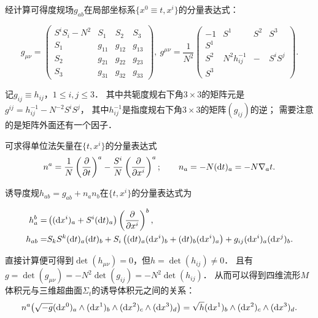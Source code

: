 经计算可得度规场$g_{ab}$在局部坐标系$\{x^0\equiv t,x^i \}$的分量表达式：
\begin{small}
\begin{equation}\label{chsm:eqn_ADM-metric}
    g_{\mu\nu}=\begin{pmatrix}
        S^i S_i -N^2 & S_1 & S_2 &S_3 \\
        S_1 &g_{11} & g_{12} & g_{13} \\
        S_2 &g_{21} & g_{22} & g_{23} \\
        S_3 &g_{31} & g_{32} & g_{33}
    \end{pmatrix}, \
    g^{\mu\nu}=\frac{1}{N^{2}} \begin{pmatrix}
        -1 & S^1 & S^2 & S^3 \\
        S^1 & &  &  \\
        S^2 &N^{2} h_{ij}^{-1} & - & S^i S^j \\
        S^3 & &  &
    \end{pmatrix} .
\end{equation}
\end{small}
记$g_{ij}\equiv h_{ij}$，$1\leqslant i,j \leqslant 3$．
其中共轭度规右下角$3\times 3$的矩阵元是$g^{ij}= h_{ij}^{-1}-N^{-2}S^i S^j$，
其中$h_{ij}^{-1}$是指度规右下角$3\times 3$的矩阵$(g_{ij})$的逆；
需要注意的是矩阵外面还有一个因子．

可求得单位法矢量在$\{t,x^i\}$的分量表达式
\begin{equation}\label{chsm:eqn_ADM-n}
    n^a = \frac{1}{N} \left(\frac{\partial }{\partial t}\right)^a
    -\frac{S^i}{N} \left(\frac{\partial }{\partial x^i}\right)^a  ;\qquad
    n_a = -N ({\rm d}t)_a = -N \nabla_a t .
\end{equation}


诱导度规$h_{ab}=g_{ab}+n_a n_b$在$\{t,x^i\}$的分量表达式为
\begin{small}
\begin{subequations}\label{chsm:eqn_ADM-hab}
\begin{align}
    h_a^b =& \left( ({\rm d}x^i)_a +S^i ({\rm d}t)_a \right) 
    \left(\frac{\partial }{\partial x^i}\right)^b , \label{chsm:eqn_ADM-hab-1}\\
    h_{ab}=& S_k S^k ({\rm d}t)_a ({\rm d}t)_b + S_i\left( ({\rm d}t)_a ({\rm d}x^i)_b
    + ({\rm d}t)_b ({\rm d}x^i)_a \right) + g_{ij} ({\rm d}x^i)_a ({\rm d}x^j)_b .
    \label{chsm:eqn_ADM-hab-2} 
\end{align}
\end{subequations}
\end{small}
直接计算便可得到$\det(h_{\mu\nu})=0$，但$h=\det(h_{ij})\neq 0$．
且有$g=\det(g_{\mu\nu})=-N^2 \det(g_{ij})=-N^2 \det(h_{ij})$．
从而可以得到四维流形$M$体积元与三维超曲面$\Sigma_t$的诱导体积元之间的关系：
\begin{equation}
   n^a \bigl(\sqrt{-g}({\rm d}x^0)_a \wedge ({\rm d}x^1)_b \wedge({\rm d}x^2)_c \wedge({\rm d}x^3)_d \bigr) 
        = \sqrt{h} ({\rm d}x^1)_b \wedge({\rm d}x^2)_c \wedge({\rm d}x^3)_d  .
\end{equation}


